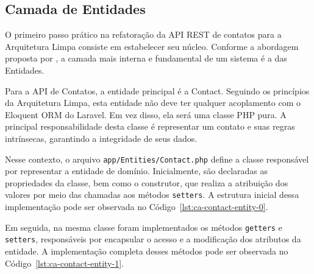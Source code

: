 \subsection{Camada de Entidades}

        \par O primeiro passo prático na refatoração da API REST de contatos para a Arquitetura Limpa consiste em estabelecer seu núcleo. Conforme a abordagem proposta por \cite{livro:martin:cleanarch}, a camada mais interna e fundamental de um sistema é a das Entidades.

        \par Para a API de Contatos, a entidade principal é a Contact. Seguindo os princípios da Arquitetura Limpa, esta entidade não deve ter qualquer acoplamento com o Eloquent ORM do Laravel. Em vez disso, ela será uma classe PHP pura. A principal responsabilidade desta classe é representar um contato e suas regras intrínsecas, garantindo a integridade de seus dados.

        \par Nesse contexto, o arquivo \texttt{app/Entities/Contact.php} define a classe responsável por representar a entidade de domínio. Inicialmente, são declaradas as propriedades da classe, bem como o construtor, que realiza a atribuição dos valores por meio das chamadas aos métodos \texttt{setters}. A estrutura inicial dessa implementação pode ser observada no Código~\ref{lst:ca-contact-entity-0}.

        

        \par Em seguida, na mesma classe foram implementados os métodos \texttt{getters} e \texttt{setters}, responsáveis por encapsular o acesso e a modificação dos atributos da entidade. A implementação completa desses métodos pode ser observada no Código~\ref{lst:ca-contact-entity-1}.

        

